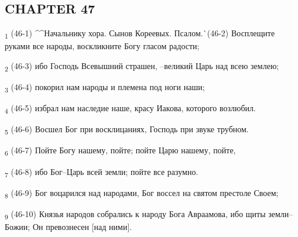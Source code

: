 \subsection{CHAPTER 47}
\begin{tcolorbox}
\textsubscript{1} (46-1) ^^Начальнику хора. Сынов Кореевых. Псалом.^^ (46-2) Восплещите руками все народы, воскликните Богу гласом радости;
\end{tcolorbox}
\begin{tcolorbox}
\textsubscript{2} (46-3) ибо Господь Всевышний страшен, --великий Царь над всею землею;
\end{tcolorbox}
\begin{tcolorbox}
\textsubscript{3} (46-4) покорил нам народы и племена под ноги наши;
\end{tcolorbox}
\begin{tcolorbox}
\textsubscript{4} (46-5) избрал нам наследие наше, красу Иакова, которого возлюбил.
\end{tcolorbox}
\begin{tcolorbox}
\textsubscript{5} (46-6) Восшел Бог при восклицаниях, Господь при звуке трубном.
\end{tcolorbox}
\begin{tcolorbox}
\textsubscript{6} (46-7) Пойте Богу нашему, пойте; пойте Царю нашему, пойте,
\end{tcolorbox}
\begin{tcolorbox}
\textsubscript{7} (46-8) ибо Бог--Царь всей земли; пойте все разумно.
\end{tcolorbox}
\begin{tcolorbox}
\textsubscript{8} (46-9) Бог воцарился над народами, Бог воссел на святом престоле Своем;
\end{tcolorbox}
\begin{tcolorbox}
\textsubscript{9} (46-10) Князья народов собрались к народу Бога Авраамова, ибо щиты земли--Божии; Он превознесен [над ними].
\end{tcolorbox}
